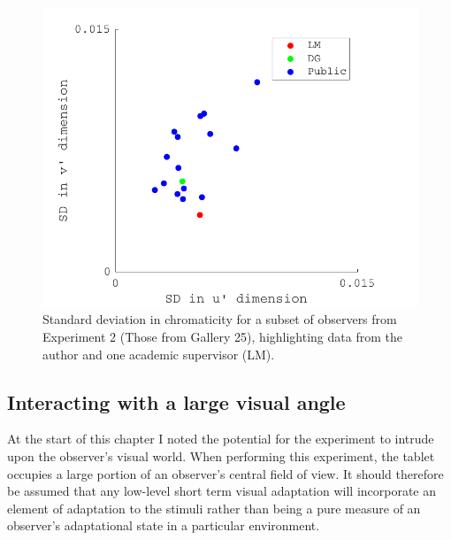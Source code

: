 \begin{figure}[hbtp]
\includegraphics[max width=\textwidth]{figs/tablet/naive.pdf} 
\caption{Standard deviation in chromaticity for a subset of observers from Experiment 2 (Those from Gallery 25), highlighting data from the author and one academic supervisor (LM).}
\label{fig:naive}
\end{figure}

\subsection{Interacting with a large visual angle}

At the start of this chapter I noted the potential for the experiment to intrude upon the observer's visual world. When performing this experiment, the tablet occupies a large portion of an observer's central field of view. It should therefore be assumed that any low-level short term visual adaptation will incorporate an element of adaptation to the stimuli rather than being a pure measure of an observer's adaptational state in a particular environment. 

